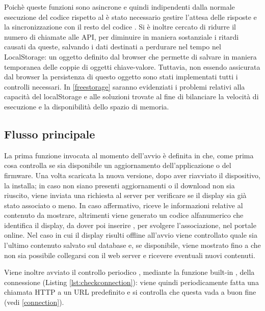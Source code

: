 Poichè queste funzioni sono asincrone e quindi indipendenti dalla normale esecuzione del codice rispetto al  è stato necessario gestire l'attesa delle risposte e la sincronizzazione con il resto del codice . Si è inoltre cercato di ridurre il numero di chiamate alle API, per diminuire in maniera sostanziale i ritardi causati da queste, salvando i dati destinati a perdurare nel tempo nel LocalStorage: un oggetto definito dal browser che permette di salvare in maniera temporanea delle coppie di oggetti chiave-valore. Tuttavia, non essendo assicurata dal browser la persistenza di questo oggetto sono stati implementati tutti i controlli necessari. In \ref*{freestorage} saranno evidenziati i problemi relativi alla capacità del localStorage e alle soluzioni trovate al fine di bilanciare la velocità di esecuzione e la disponibilità dello spazio di memoria.

\subsection{Flusso principale}\label{flusso_principale}

La prima funzione invocata al momento dell'avvio è  definita in  che, come prima cosa controlla se sia disponibile un aggiornamento dell'applicazione o del firmware. Una volta scaricata la nuova versione, dopo aver riavviato il dispositivo, la installa; in caso non siano presenti aggiornamenti o il download non sia riuscito, viene inviata una richiesta al server per verificare se il display sia già stato associato o meno. In caso affermativo, riceve le informazioni relative al contenuto da mostrare, altrimenti viene generato  un codice alfanumerico che identifica il display, da dover poi inserire , per svolgere l'associazione, nel portale online. Nel caso in cui il display risulti offline all'avvio viene controllato quale sia l'ultimo contenuto salvato sul database e, se disponibile, viene mostrato fino a che non sia possibile collegarsi con il web server e ricevere eventuali nuovi contenuti.

Viene inoltre avviato il controllo periodico , mediante la funzione built-in , della connessione (Listing \ref*{lst:checkconnection}): viene quindi periodicamente  fatta una chiamata HTTP a un URL predefinito e si controlla che questa vada a buon fine (vedi \ref*{connection}).

